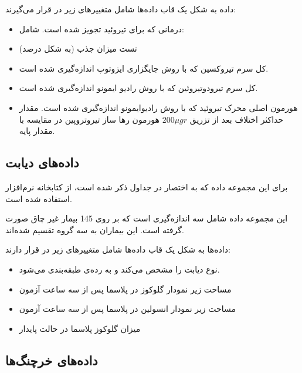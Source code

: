 داده به شکل یک قاب دا‌ده‌ها
شامل متغییر‌های زیر در 
قرار می‌گیرند:
\begin{itemize}
\item
{}
درمانی که برای تیروئید تجویز شده است. شامل:
\item
{}
تست میزان جذب 
(به شکل درصد)
\item
{}
کل سرم تیروکسین که با روش جایگزاری ایزوتوپ
اندازه‌گیری شده است.
\item
{}
کل سرم تیرودوتیروئین 
که با روش رادیو ایمونو
اندازه‌گیری شده است.
\item
{}
هورمون اصلی محرک تیروئید که با روش رادیوایمونو اندازه‌گیری شده است.
مقدار حداکثر اختلاف
بعد از تزریق
$200 \mu gr$
هورمون رها ساز تیروتروپین
در مقایسه با مقدار پایه.
\end{itemize}


\subsection{
داده‌های دیابت
}

برای این مجموعه داده که به اختصار 
در جداول ذکر شده است، از کتابخانه
\cite{rmclust}
نرم‌افزار 
استفاده شده است.

این مجموعه داده شامل سه اندازه‌گیری است که بر روی 145 بیمار غیر چاق صورت گرفته است. این بیماران به سه گروه تقسیم شده‌اند.

داده‌ها به شکل یک قاب داده‌ها شامل متغییرهای زیر در 
قرار دارند:

\begin{itemize}
\item
{}
نوع دیابت را مشخص می‌کند و به رده‌ی 
طبقه‌بندی می‌شود.
\item
{}
مساحت زیر نمودار گلوکوز در پلاسما پس از سه ساعت آزمون 
\item
{}
مساحت زیر نمودار انسولین در پلاسما پس از سه ساعت آزمون
\item
{}
میزان گلوکوز پلاسما در حالت پایدار
\end{itemize}

\subsection{
داده‌های خرچنگ‌ها
}


